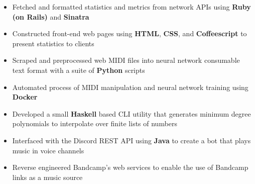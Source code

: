 \documentclass[10pt,letterpaper]{altacv}
\begin{document}
\divider

\begin{itemize}
    \item Fetched and formatted statistics and metrics from network APIs 
        using \textbf{Ruby (on Rails)} and \textbf{Sinatra}
    \item Constructed front-end web pages using \textbf{HTML}, \textbf{CSS}, and 
        \textbf{Coffeescript} to present statistics to clients
\end{itemize}



\smallskip


\begin{itemize}
    \item Scraped and preprocessed web MIDI files into neural network 
        consumable text format with a suite of \textbf{Python} scripts
    \item Automated process of MIDI manipulation and neural network training 
        using \textbf{Docker}
\end{itemize}

\divider

\begin{itemize}
    \item Developed a small \textbf{Haskell} based CLI utility that generates 
        minimum degree polynomials to interpolate over finite lists of numbers
\end{itemize}

\divider

\begin{itemize}
    \item Interfaced with the Discord REST API using \textbf{Java} to create a 
        bot that plays music in voice channels
    \item Reverse engineered Bandcamp's web services to enable the use of 
        Bandcamp links as a music source
\end{itemize}
\end{document}
